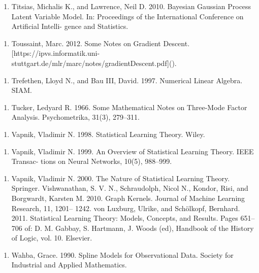 \begin{enumerate}
\item Titsias, Michalis K., and Lawrence, Neil D. 2010. Bayesian Gaussian Process Latent Variable Model. In: Proceedings of the International Conference on Artiﬁcial Intelli- gence and Statistics.
\end{enumerate}

\begin{enumerate}
\item Toussaint, Marc. 2012. Some Notes on Gradient Descent. [https://ipvs.informatik.uni-stuttgart.de/mlr/marc/notes/gradientDescent.pdf]().
\end{enumerate}

\begin{enumerate}
\item Trefethen, Lloyd N., and Bau III, David. 1997. Numerical Linear Algebra. SIAM.
\end{enumerate}

\begin{enumerate}
\item Tucker, Ledyard R. 1966. Some Mathematical Notes on Three-Mode Factor Analysis. Psychometrika, 31(3), 279–311.
\end{enumerate}

\begin{enumerate}
\item Vapnik, Vladimir N. 1998. Statistical Learning Theory. Wiley.
\end{enumerate}

\begin{enumerate}
\item Vapnik, Vladimir N. 1999. An Overview of Statistical Learning Theory. IEEE Transac- tions on Neural Networks, 10(5), 988–999.
\end{enumerate}

\begin{enumerate}
\item Vapnik, Vladimir N. 2000. The Nature of Statistical Learning Theory. Springer. Vishwanathan, S. V. N., Schraudolph, Nicol N., Kondor, Risi, and Borgwardt, Karsten M. 2010. Graph Kernels. Journal of Machine Learning Research, 11, 1201– 1242. von Luxburg, Ulrike, and Schölkopf, Bernhard. 2011. Statistical Learning Theory: Models, Concepts, and Results. Pages 651–706 of: D. M. Gabbay, S. Hartmann, J. Woods (ed), Handbook of the History of Logic, vol. 10. Elsevier.
\end{enumerate}

\begin{enumerate}
\item Wahba, Grace. 1990. Spline Models for Observational Data. Society for Industrial and Applied Mathematics.
\end{enumerate}

